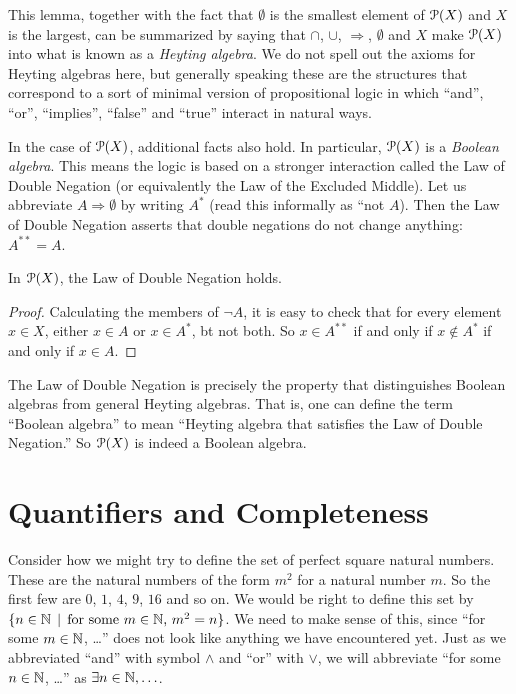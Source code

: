This lemma, together with the fact that $\emptyset$ is the smallest element of ${\mathcal{P}}(X)$ and $X$ is the largest, can be summarized by saying that $\cap$, $\cup$, $\Rightarrow$, $\emptyset$ and $X$ make ${\mathcal{P}}(X)$ into what is known as a \emph{Heyting algebra}. 
We do not spell out the axioms for Heyting algebras here, but generally speaking these are the structures that correspond to a sort of minimal version of propositional logic in which ``and'', ``or'', ``implies'', ``false'' and ``true'' interact in natural ways. 

In the case of ${\mathcal{P}}(X)$, additional facts also hold. 
In particular, ${\mathcal{P}}(X)$ is a \emph{Boolean algebra}. 
This means the logic is based on a stronger interaction called the Law of Double Negation (or equivalently the Law of the Excluded Middle). 
Let us abbreviate $A\Rightarrow\emptyset$ by writing $A^*$ (read this informally as ``not $A$). 
Then the Law of Double Negation asserts that double negations do not change anything: $A^{**} = A$.

\begin{lemma}
	In ${\mathcal{P}}(X)$, the Law of Double Negation holds.
	
	\begin{proof}
		Calculating the members of $\neg A$, it is easy to check that for every element $x\in X$, either $x\in A$ or $x\in A^*$, bt not both. So $x\in A^{**}$ if and only if $x\notin A^*$ if and only if $x\in A$. 
	\end{proof}
\end{lemma}

The Law of Double Negation is precisely the property that distinguishes Boolean algebras from general Heyting algebras. 
That is, one can define the term ``Boolean algebra'' to mean ``Heyting algebra that satisfies the Law of Double Negation.''
So ${\mathcal{P}}(X)$ is indeed a Boolean algebra.

\section{Quantifiers and Completeness}

Consider how we might try to define the set of perfect square natural numbers. These are the natural numbers of the form $m^2$ for a natural number $m$. So the first few are $0$, $1$, $4$, $9$, $16$ and so on. We would be right to define this set by $\{n\in \mathbb N\,\mid\, \text{for some $m\in\mathbb N$, $m^2=n$}\}$. We need to make sense of this, since ``for some $m\in \mathbb N$, \ldots'' does not look like anything we have encountered yet. Just as we abbreviated ``and'' with symbol $\wedge$ and ``or'' with $\vee$, we will abbreviate ``for some $n\in\mathbb N$, \ldots'' as $\exists n\in \mathbb N,\ldots$. 


